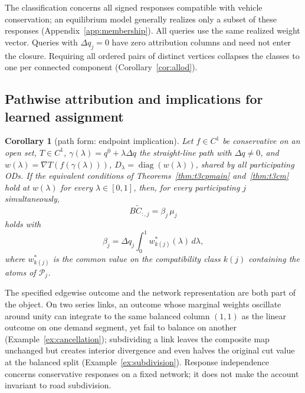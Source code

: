 \documentclass[a4paper,fleqn]{cas-sc}
\newtheorem{corollary}[theorem]{Corollary}
\begin{document}
The classification concerns all signed responses compatible with vehicle
conservation; an equilibrium model generally realizes only a subset of
these responses (Appendix~\ref{app:membership}).
All queries use the same realized weight vector. Queries with $\Delta q_j=0$
have zero attribution columns and need not enter the closure. Requiring all
ordered pairs of distinct vertices collapses the classes to one per
connected component (Corollary~\ref{cor:allod}).

\subsection{Pathwise attribution and implications for learned assignment}\label{sec:pathwise}
\begin{corollary}[path form: endpoint implication]\label{cor:path}
Let $f\in C^1$ be conservative on an open set, $T\in C^1$,
$\gamma(\lambda)=q^0+\lambda\Delta q$ the straight-line path with $\Delta q\ne0$, and
$w(\lambda)=\nabla T(f(\gamma(\lambda)))$, $D_\lambda=\operatorname{diag}(w(\lambda))$, shared by
all participating ODs. If the equivalent conditions of
Theorems~\ref{thm:t3cpmain} and~\ref{thm:t3cm} hold at $w(\lambda)$ for
every $\lambda\in[0,1]$, then, for every participating $j$
simultaneously,
\[
B\widetilde{C}_{:,j}=\beta_j\,\mu_j
\]
holds with
\[
\beta_j=\Delta q_j\int_0^1 w^*_{k(j)}(\lambda)\,d\lambda,
\]
where $w^*_{k(j)}$
is the common value on the compatibility class $k(j)$ containing the
atoms of $\mathcal{P}_j$.
\end{corollary}

The specified edgewise outcome and the network representation are both
part of the object. On two series links, an outcome whose marginal
weights oscillate around unity can integrate to the same balanced column
$(1,1)$ as the linear outcome on one demand segment, yet fail to balance
on another (Example~\ref{ex:cancellation}); subdividing a link leaves
the composite map unchanged but creates interior divergence and even
halves the original cut value at the balanced split
(Example~\ref{ex:subdivision}). Response independence concerns
conservative responses on a fixed network; it does not make the account
invariant to road subdivision.
\end{document}
